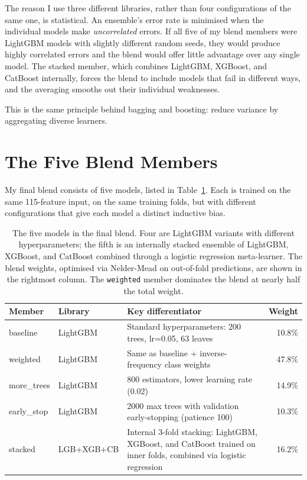 \begin{remarkbox}
The reason I use three different libraries, rather than four configurations of the same one, is statistical. An ensemble's error rate is minimised when the individual models make \emph{uncorrelated} errors. If all five of my blend members were LightGBM models with slightly different random seeds, they would produce highly correlated errors and the blend would offer little advantage over any single model. The stacked member, which combines LightGBM, XGBoost, and CatBoost internally, forces the blend to include models that fail in different ways, and the averaging smooths out their individual weaknesses.

This is the same principle behind bagging and boosting: reduce variance by aggregating diverse learners.
\end{remarkbox}

\section{The Five Blend Members}

My final blend consists of five models, listed in Table~\ref{tab:blend-members}. Each is trained on the same 115-feature input, on the same training folds, but with different configurations that give each model a distinct inductive bias.

\begin{table}[htbp]
 \centering
 \caption[Five blend members]{The five models in the final blend. Four are LightGBM variants with different hyperparameters; the fifth is an internally stacked ensemble of LightGBM, XGBoost, and CatBoost combined through a logistic regression meta-learner. The blend weights, optimised via Nelder-Mead on out-of-fold predictions, are shown in the rightmost column. The \texttt{weighted} member dominates the blend at nearly half the total weight.}
 \label{tab:blend-members}
 \small
 \begin{tabular}{llp{5.5cm}r}
 \toprule
 Member & Library & Key differentiator & Weight \\
 \midrule
 baseline & LightGBM & Standard hyperparameters: 200 trees, lr=0.05, 63 leaves & 10.8\% \\
 weighted & LightGBM & Same as baseline + inverse-frequency class weights & 47.8\% \\
 more\_trees & LightGBM & 800 estimators, lower learning rate (0.02) & 14.9\% \\
 early\_stop & LightGBM & 2000 max trees with validation early-stopping (patience 100) & 10.3\% \\
 stacked & LGB+XGB+CB & Internal 3-fold stacking: LightGBM, XGBoost, and CatBoost trained on inner folds, combined via logistic regression & 16.2\% \\
 \bottomrule
 \end{tabular}
\end{table}

